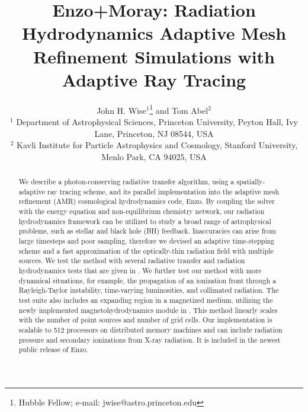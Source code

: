 \documentclass[useAMS,usenatbib,a4paper]{mn2e}
\begin{document}
\title[AMR Simulations with Adaptive Ray Tracing] {Enzo+Moray:
  Radiation Hydrodynamics Adaptive Mesh Refinement Simulations with
  Adaptive Ray Tracing}

\author[J. H. Wise and T. Abel] {John H. Wise$^1$\thanks{Hubble
    Fellow; e-mail: jwise@astro.princeton.edu} and Tom Abel$^2$\\
$^{1}$ Department of Astrophysical Sciences, Princeton University,
Peyton Hall, Ivy Lane, Princeton, NJ 08544, USA\\
$^{2}$ Kavli Institute for Particle Astrophysics and Cosmology,
Stanford University, Menlo Park, CA 94025, USA}

\pagerange{\pageref{firstpage}--\pageref{lastpage}} 

\maketitle
\label{firstpage}

\begin{abstract}

  We describe a photon-conserving radiative transfer algorithm, using
  a spatially-adaptive ray tracing scheme, and its parallel
  implementation into the adaptive mesh refinement (AMR) cosmological
  hydrodynamics code, Enzo.  By coupling the solver with the energy
  equation and non-equilibrium chemistry network, our radiation
  hydrodynamics framework can be utilized to study a broad range of
  astrophysical problems, such as stellar and black hole (BH)
  feedback.  Inaccuracies can arise from large timesteps and poor
  sampling, therefore we devised an adaptive time-stepping scheme and
  a fast approximation of the optically-thin radiation field with
  multiple sources.  We test the method with several radiative
  transfer and radiation hydrodynamics tests that are given in
  \citet{RT06, Iliev09}.  We further test our method with more
  dynamical situations, for example, the propagation of an ionization
  front through a Rayleigh-Taylor instability, time-varying
  luminosities, and collimated radiation.  The test suite also
  includes an expanding \hii region in a magnetized medium, utilizing
  the newly implemented magnetohydrodynamics module in \enzo.  This
  method linearly scales with the number of point sources and number
  of grid cells.  Our implementation is scalable to 512 processors on
  distributed memory machines and can include radiation pressure and
  secondary ionizations from X-ray radiation.  It is included in the
  newest public release of Enzo.
  
\end{abstract}
\end{document}
